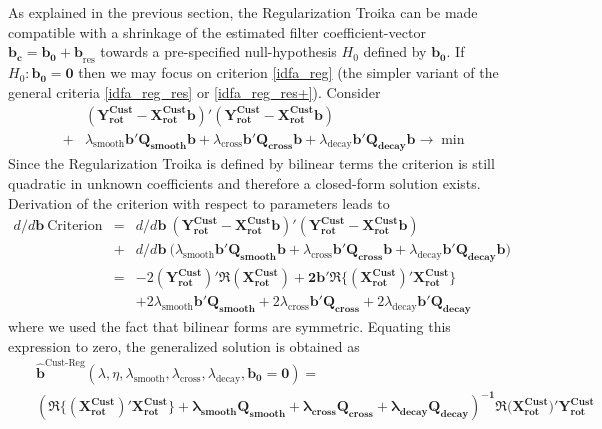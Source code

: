 \documentclass[11pt]{article}
\begin{document}
As explained in the previous section, the Regularization Troika can be made compatible with a shrinkage of the estimated filter coefficient-vector $\mathbf{b_c}=\mathbf{b_0+b}_{\textrm{res}}$ towards a pre-specified null-hypothesis $H_0$ defined by $\mathbf{b_{0}}$. If 
$H_0:\mathbf{b_0=0}$ then we may focus on criterion  \ref{idfa_reg} (the simpler variant of the general criteria  \ref{idfa_reg_res} or 
 \ref{idfa_reg_res+}).
Consider
\begin{eqnarray}\label{regcustreg}
&&(\mathbf{Y_{\textrm{rot}}^{\textrm{Cust}}-X_{\textrm{rot}}^{\textrm{Cust}}b})'(\mathbf{Y_{\textrm{rot}}^{\textrm{Cust}}-X_{\textrm{rot}}^{\textrm{Cust}}b})\nonumber\\
&+&\lambda_{\textrm{smooth}}\mathbf{b'Q_{smooth}b}
+\lambda_{\textrm{cross}}\mathbf{b'Q_{cross}b}+\lambda_{\textrm{decay}}\mathbf{b'Q_{decay}b}\to\min
\end{eqnarray}
Since the Regularization Troika is defined by bilinear terms the criterion is still quadratic in unknown coefficients and therefore a closed-form solution exists. Derivation of the criterion with respect to parameters leads to
\begin{eqnarray*}
d/d\mathbf{b}~\textrm{Criterion}&=&d/d\mathbf{b}~(\mathbf{Y_{\textrm{rot}}^{\textrm{Cust}}-X_{\textrm{rot}}^{\textrm{Cust}}b})'(\mathbf{Y_{\textrm{rot}}^{\textrm{Cust}}-X_{\textrm{rot}}^{\textrm{Cust}}b})\nonumber\\
&+&d/d\mathbf{b}~\Big(\lambda_{\textrm{smooth}}\mathbf{b'Q_{smooth}b}
+\lambda_{\textrm{cross}}\mathbf{b'Q_{cross}b}+\lambda_{\textrm{decay}}\mathbf{b'Q_{decay}b}\Big)\\
&=&-2\mathbf{(Y_{\textrm{rot}}^{\textrm{Cust}})'\Re\left(X_{\textrm{rot}}^{\textrm{Cust}}\right)+2b'\Re\bigg\{(X_{\textrm{rot}}^{\textrm{Cust}})'X_{\textrm{rot}}^{\textrm{Cust}}\bigg\}}\\
&&+2\lambda_{\textrm{smooth}}\mathbf{b'Q_{smooth}}
+2\lambda_{\textrm{cross}}\mathbf{b'Q_{cross}}+2\lambda_{\textrm{decay}}\mathbf{b'Q_{decay}}
\end{eqnarray*}
where we used the fact that bilinear forms are symmetric. Equating this expression to zero, the generalized solution is obtained as
\begin{eqnarray}\label{bregcustreg}
&&\mathbf{\hat{b}}^{\textrm{Cust-Reg}}(\lambda,\eta,\lambda_{\textrm{smooth}},\lambda_{\textrm{cross}},\lambda_{\textrm{decay}},\mathbf{b_0=0})=\\
&&\mathbf{\left(\Re\bigg\{(X_{\textrm{rot}}^{\textrm{Cust} })' X_{\textrm{rot}}^{\textrm{Cust}}\bigg\}+
\lambda_{\textrm{smooth}}\mathbf{Q_{smooth}}+\lambda_{\textrm{cross}}\mathbf{Q_{cross}}+\lambda_{\textrm{decay}}\mathbf{Q_{decay}}
\right)^{-1}\Re(X_{\textrm{rot}}^{\textrm{Cust}}})'
\mathbf{Y_{\textrm{rot}}^{\textrm{Cust}}}\nonumber
\end{eqnarray}
\end{document}
